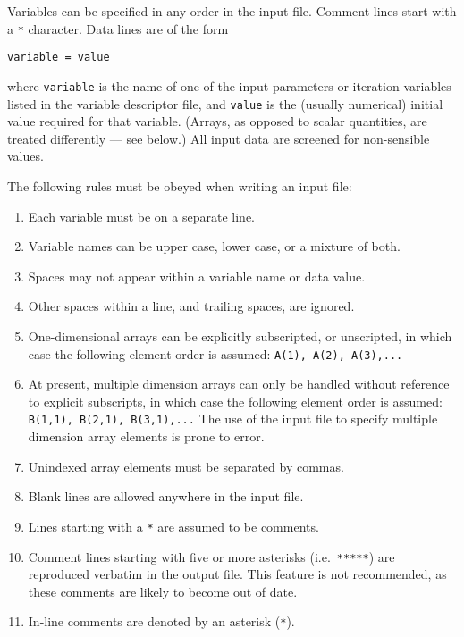 \documentclass[11pt,a4paper]{report}
\begin{document}
Variables can be specified in any order in the input file.  Comment lines start with a \texttt{*} character.  Data lines are of the form
\begin{verbatim}
variable = value
\end{verbatim}
where \texttt{variable} is the name of one of the input parameters or
iteration variables listed in the variable descriptor file, and \texttt{value}
is the (usually numerical) initial value required for that variable. (Arrays,
as opposed to scalar quantities, are treated differently --- see below.) All input data are screened for non-sensible values.

The following rules must be obeyed when writing an input file:

\begin{enumerate}

\item Each variable must be on a separate line.

\item Variable names can be upper case, lower case, or a mixture of both.

\item Spaces may not appear within a variable name or data value.

\item Other spaces within a line, and trailing spaces, are ignored.

\item One-dimensional arrays can be explicitly subscripted, or unscripted, in
  which case the following element order is assumed: \texttt{A(1), A(2),
    A(3),...}

\item At present, multiple dimension arrays can only be handled without
  reference to explicit subscripts, in which case the following element order
  is assumed: \texttt{B(1,1), B(2,1), B(3,1),...} The use of the input file to
  specify multiple dimension array elements is prone to error.

\item Unindexed array elements must be separated by commas.

\item Blank lines are allowed anywhere in the input file.

\item Lines starting with a \texttt{*} are assumed to be comments.

\item Comment lines starting with five or more asterisks (i.e.\
  \texttt{*****}) are reproduced verbatim in the output file. This feature is not recommended, as these comments are likely to become out of date.

\item In-line comments are denoted by an asterisk (\texttt{*}).

\end{enumerate}
\end{document}
